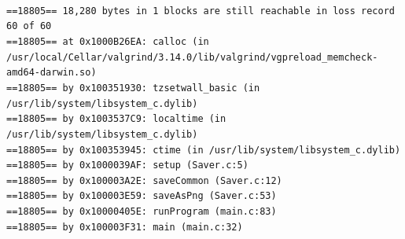 \documentclass{mwart}
\begin{document}
\begin{scriptsize}
\noindent \texttt{\noindent 
\\==18805== 18,280 bytes in 1 blocks are still reachable in loss record 60 of 60
\\==18805==    at 0x1000B26EA: calloc (in /usr/local/Cellar/valgrind/3.14.0/lib/valgrind/vgpreload\_memcheck-amd64-darwin.so)
\\==18805==    by 0x100351930: tzsetwall\_basic (in /usr/lib/system/libsystem\_c.dylib)
\\==18805==    by 0x1003537C9: localtime (in /usr/lib/system/libsystem\_c.dylib)
\\==18805==    by 0x100353945: ctime (in /usr/lib/system/libsystem\_c.dylib)
\\==18805==    by 0x1000039AF: setup (Saver.c:5)
\\==18805==    by 0x100003A2E: saveCommon (Saver.c:12)
\\==18805==    by 0x100003E59: saveAsPng (Saver.c:53)
\\==18805==    by 0x10000405E: runProgram (main.c:83)
\\==18805==    by 0x100003F31: main (main.c:32)
}
\end{scriptsize}
\end{document}
